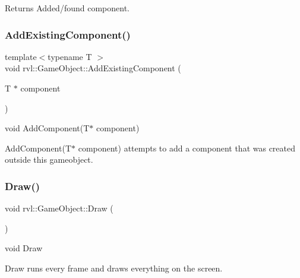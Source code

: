 \begin{DoxyReturn}{Returns}
Added/found component. 
\end{DoxyReturn}
\mbox{\label{classrvl_1_1_game_object_a63f068f892b213ef8f72501ed2967aa7}} 
\subsubsection{\texorpdfstring{Add\+Existing\+Component()}{AddExistingComponent()}}
{\footnotesize\ttfamily template$<$typename T $>$ \\
void rvl\+::\+Game\+Object\+::\+Add\+Existing\+Component (\begin{DoxyParamCaption}\item[{T $\ast$}]{component }\end{DoxyParamCaption})\hspace{0.3cm}{\ttfamily [inline]}}



void Add\+Component(\+T$\ast$ component) 

Add\+Component(\+T$\ast$ component) attempts to add a component that was created outside this gameobject. \mbox{\label{classrvl_1_1_game_object_a69e5c86216b242ae78efa64ffde2ac17}} 
\subsubsection{\texorpdfstring{Draw()}{Draw()}}
{\footnotesize\ttfamily void rvl\+::\+Game\+Object\+::\+Draw (\begin{DoxyParamCaption}{ }\end{DoxyParamCaption})}



void Draw 

Draw runs every frame and draws everything on the screen. \mbox{\label{classrvl_1_1_game_object_a275a49882a7d619adef9698fee03fdab}} 
